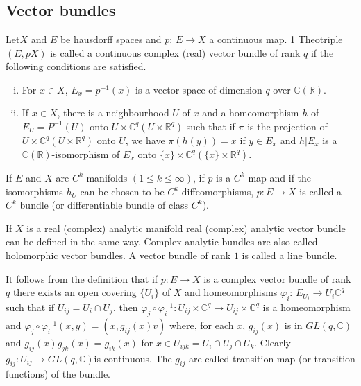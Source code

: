 \chapter{}\label{chap3}

\section{Vector bundles}\label{chap3:sec1} %

\begin{defi*}
  Let\pageoriginale $X$ and $E$ be hausdorff spaces and $p$: $E \to X$ a 
  continuous map. 1 Theotriple $(E, pX)$ is called a 
  continuous complex (real) vector bundle of rank $q$ if the
  following conditions are satisfied.  
  \begin{enumerate}[(i)]
  \item For $x \in X$, $E_x=p^{-1} (x)$ is a vector space of dimension
    $q$ over $\mathbb{C} (\mathbb{R})$. 
  \item If $x \in X$, there is a neighbourhood $U$ of $x$ and a
    homeomorphism $h$ of $E_U=P^{-1}(U)$ onto $U \times \mathbb{C}^q (U
    \times \mathbb{R}^q)$ such that if $\pi$ is the projection of $U
    \times \mathbb{C}^q (U \times \mathbb{R}^q)$ onto $U$, we have
    $\pi (h(y))=x$ if $y \in E_x$ and $h|E_x$ is a
    $\mathbb{C}(\mathbb{R})$-isomorphism of $E_x$ onto $\{ x \} \times
    \mathbb{C}^q (\{ x\} \times \mathbb{R}^q)$. 
  \end{enumerate}
\end{defi*}

If $E$ and $X$ are $C^k$ manifolds $(1 \leq k \leq \infty)$, if $p$ is
a $C^k$ map and if the isomorphisms $h_U$ can be chosen to be $C^k$
diffeomorphisms, $p: E \to X$ is called a $C^k$ bundle (or
differentiable bundle of class $C^k$). 

If $X$ is a real (complex) analytic manifold real (complex) analytic
vector bundle can be defined in the same way. Complex analytic
bundles are also called holomorphic vector bundles. A vector
bundle of rank $1$ is called a line bundle. 

It follows from the definition that if $p:E \to X$ is a complex vector
bundle of rank $q$ there exists an open covering $\{ U_i \}$ of $X$
and homeomorphisms $\varphi_i$: $E_{U_i} \to U_i \mathbb{C}^q$ such
that if $U_{ij} = U_i \cap U_j$, then  $\varphi_j \circ \varphi^{-1}_i
: U_{ij}\times \mathbb{C}^q \to U_{ij} \times \mathbb{C}^q$
is a homeomorphism and $\varphi_j \circ \varphi^{-1}_i (x, y) = (x,
g_{ij}(x)v)$ where, for each $x$, $g_{ij}(x)$ is in $GL(q
,\mathbb{C})$ and $g_{ij}(x)g_{jk}(x)=g_{ik}(x)$ for $x \in
U_{ijk}=U_i \cap U_j \cap U_k$. Clearly $g_{ij}:U_{ij} \to GL(q,
\mathbb{C})$\pageoriginale is continuous. The $g_{ij}$ are called transition map (or
transition functions) of the bundle. 

